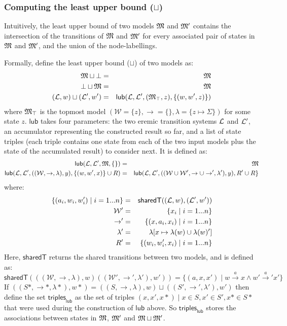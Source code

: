 \subsubsection{Computing the least upper bound ($\sqcup$)}
Intuitively, the least upper bound of two models $\frak{M}$ and $\frak{M}'$ contains the intersection of the transitions of $\frak{M}$ and $\frak{M}'$ for every associated pair of states in $\frak{M}$ and $\frak{M}'$, and the union of the node-labellings.

Formally, define the least upper bound ($\sqcup$) of two models as:
\begin{eqnarray*}
\frak{M} \sqcup \bot & = & \frak{M} \\
\bot \sqcup \frak{M} & = & \frak{M} \\
(\mathcal{L},w) \sqcup (\mathcal{L}',w') & = & \mathsf{lub}(\mathcal{L}, \mathcal{L}', (\frak{M}_\top, z), \{(w, w', z)\})
\end{eqnarray*}
where $\frak{M}_\top$ is the topmost model $(\mathcal{W}=\{z\}, \rightarrow=\{\}, \lambda=\{z \mapsto \Sigma\})$ for some state $z$.
$\mathsf{lub}$ takes four parameters: the two eremic transition systems $\mathcal{L}$ and $\mathcal{L}'$, an accumulator representing the constructed result so far, and a list of state triples (each triple contains one state from each of the two input models plus the state of the accumulated result) to consider next.
It is defined as:
\begin{eqnarray*}
\mathsf{lub}(\mathcal{L}, \mathcal{L}', \frak{M}, \{\}) & = & \frak{M} \\
\mathsf{lub}(\mathcal{L}, \mathcal{L}', ((\mathcal{W}, \rightarrow, \lambda), y), \{(w,w',x)\} \cup R) & = & \mathsf{lub}(\mathcal{L}, \mathcal{L}', ((\mathcal{W} \cup \mathcal{W}', \rightarrow \cup \rightarrow', \lambda'), y), R' \cup R\}
\end{eqnarray*}
where:
\begin{eqnarray*}
\{(a_i, w_i, w'_i) \;|\; i = 1 ... n\} & = & \mathsf{sharedT}((\mathcal{L},w), (\mathcal{L}',w')) \\
\mathcal{W}' & = & \{x_i \;|\; i = 1 ... n\} \\
\rightarrow' & = & \{(x, a_i, x_i) \;|\; i = 1 ... n\} \\
\lambda' & = & \lambda [x \mapsto \lambda(w) \cup \lambda(w)'] \\
R' & = & \{(w_i, w'_i, x_i) \;|\; i = 1 ... n\}
\end{eqnarray*}
Here, $\mathsf{sharedT}$ returns the shared transitions between two models, and is defined as:
\[
\mathsf{sharedT}(((\mathcal{W}, \rightarrow, \lambda),w) ((\mathcal{W}', \rightarrow', \lambda'),w')) =  \{(a, x, x') \;|\; w \xrightarrow{a} x \land w' \xrightarrow{a}' x'\}
\]
If $((S*,\rightarrow*,\lambda*),w*) = ((S,\rightarrow,\lambda),w) \sqcup ((S',\rightarrow',\lambda'),w')$ then define
the set $\mathsf{triples}_\mathsf{lub}$ as the set of triples $(x,x',x*) \; | \; x \in S, x' \in S', x* \in S*$ that were used during the construction of $\mathsf{lub}$ above. So $\mathsf{triples}_\mathsf{lub}$ stores the associations between states in $\frak{M}$, $\frak{M}'$ and $\frak{M} \sqcup \frak{M}'$. 

